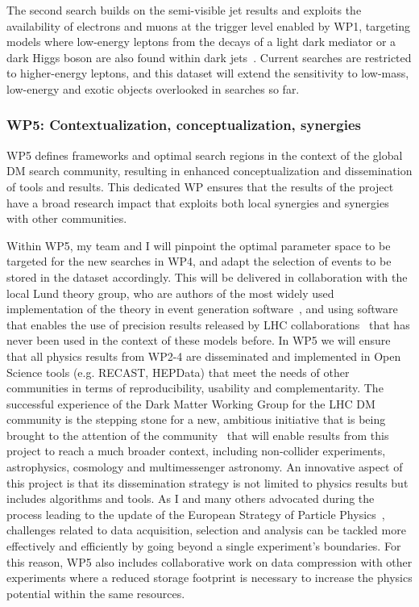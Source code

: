 \documentclass[11pt,a4paper]{article}
\begin{document}
The second search builds on the semi-visible jet results and exploits the availability of electrons and muons at the trigger level enabled by WP1, targeting models where low-energy leptons from the decays of a light dark mediator or a dark Higgs boson are also found within dark jets~\cite{Curtin:2014cca,Falkowski:2010gv}. %
Current searches are restricted to higher-energy leptons, and this dataset will extend the sensitivity to low-mass, low-energy and exotic objects overlooked in searches so far. 

\subsubsection*{WP5: Contextualization, conceptualization, synergies}

WP5 defines frameworks and optimal search regions in the context of the global DM search community, resulting in enhanced conceptualization and dissemination of tools and results.
This dedicated WP ensures that the results of the project have a broad research impact that exploits both local synergies and synergies with other communities. 

Within WP5, my team and I will pinpoint the optimal parameter space to be targeted for the new searches in WP4, and adapt the selection of events to be stored in the dataset accordingly. This will be delivered in collaboration with the local Lund theory group, who are authors of the most widely used implementation of the theory in event generation software~\cite{Sjostrand:2007gs}, and using software that enables the use of precision results released by LHC collaborations~\cite{Butterworth:2016sqg} that has never been used in the context of these models before. 
In WP5 we will ensure that all physics results from WP2-4 are disseminated and implemented in Open Science tools (e.g. RECAST, HEPData) that meet the needs of other communities in terms of reproducibility, usability and complementarity. The successful experience of the Dark Matter Working Group for the LHC DM community is the stepping stone for a new, ambitious initiative that is being brought to the attention of the community~\cite{iDMEu} that will enable results from this project to reach a much broader context, including non-collider experiments, astrophysics, cosmology and multimessenger astronomy. 
An innovative aspect of this project is that its dissemination strategy is not limited to physics results but includes algorithms and tools. 
As I and many others advocated during the process leading to the update of the European Strategy of Particle Physics~\cite{Doglioni:2019fza}, challenges related to data acquisition, selection and analysis can be tackled more effectively and efficiently by going beyond a single experiment's boundaries. 
For this reason, WP5 also includes collaborative work on data compression with other experiments where a reduced storage footprint is necessary to increase the physics potential within the same resources. %
\end{document}
